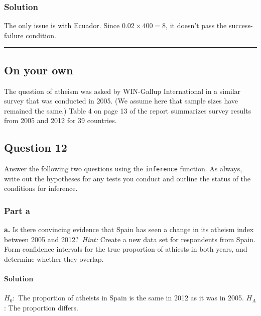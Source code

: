 \documentclass[]{article}
\let\oldparagraph\paragraph
\renewcommand{\paragraph}[1]{\oldparagraph{#1}\mbox{}}
\begin{document}
\subsubsection{Solution}\label{solution-10}

The only issue is with Ecuador. Since \(0.02 \times 400 = 8\), it
doesn't pass the success-failure condition.

\begin{center}\rule{0.5\linewidth}{\linethickness}\end{center}

\subsection{On your own}\label{on-your-own}

The question of atheism was asked by WIN-Gallup International in a
similar survey that was conducted in 2005. (We assume here that sample
sizes have remained the same.) Table 4 on page 13 of the report
summarizes survey results from 2005 and 2012 for 39 countries.

\subsection{Question 12}\label{question-12}

Answer the following two questions using the \texttt{inference}
function. As always, write out the hypotheses for any tests you conduct
and outline the status of the conditions for inference.

\subsubsection{Part a}\label{part-a}

\textbf{a.} Is there convincing evidence that Spain has seen a change in
its atheism index between 2005 and 2012?~\emph{Hint:} Create a new data
set for respondents from Spain. Form confidence intervals for the true
proportion of athiests in both years, and determine whether they
overlap.

\paragraph{Solution}\label{solution-11}

\(H_0:\) The proportion of atheists in Spain is the same in 2012 as it
was in 2005. \(H_A\): The proportion differs.
\end{document}
